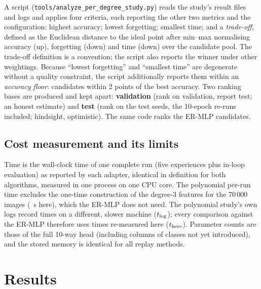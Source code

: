 \documentclass[11pt,a4paper]{article}
\begin{document}
A script (\texttt{tools/analyze\_per\_degree\_study.py}) reads the study's result files and logs and applies four criteria, each reporting the other two metrics and the configuration: highest accuracy; lowest forgetting; smallest time; and a \emph{trade-off}, defined as the Euclidean distance to the ideal point after min--max normalising accuracy (up), forgetting (down) and time (down) over the candidate pool. The trade-off definition is a convention; the script also reports the winner under other weightings. Because ``lowest forgetting'' and ``smallest time'' are degenerate without a quality constraint, the script additionally reports them within an \emph{accuracy floor}: candidates within 2 points of the best accuracy. Two ranking bases are produced and kept apart: \textbf{validation} (rank on validation, report test; an honest estimate) and \textbf{test} (rank on the test seeds, the 10-epoch re-runs included; hindsight, optimistic). The same code ranks the ER-MLP candidates.

\subsection{Cost measurement and its limits}
Time is the wall-clock time of one complete run (five experiences plus in-loop evaluation) as reported by each adapter, identical in definition for both algorithms, measured in one process on one CPU core. The polynomial per-run time excludes the one-time construction of the degree-3 features for the 70\,000 images (\numFeatureSeconds\ s here), which the ER-MLP does not need. The polynomial study's own logs record times on a different, slower machine ($t_{\rm log}$); every comparison against the ER-MLP therefore uses times re-measured here ($t_{\rm here}$). Parameter counts are those of the full 10-way head (including columns of classes not yet introduced), and the stored memory is identical for all replay methods.

\section{Results}
\end{document}
